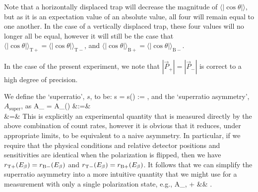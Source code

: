 Note that a horizontally displaced trap will decrease the magnitude of $\langle | \cos\theta | \rangle $, but as it is an expectation value of an absolute value, all four will remain equal to one another.  In the case of a vertically displaced trap, these four values will no longer all be equal, however it will still be the case that $\langle | \cos\theta | \rangle_{\mathrm T +} = \langle | \cos\theta | \rangle_{\mathrm T -}$, and $\langle | \cos\theta | \rangle_{\mathrm B+} = \langle | \cos\theta | \rangle_{\mathrm B -}$.  

In the case of the present experiment, we note that $|\vec{P}_+| = |\vec{P}_-|$ is correct to a high degree of precision.

We define the `superratio', $s$, to be:
\bea
s \;\;=\;\; s(\Ebeta) \;\;:=\;\; , 
\eea
and the `superratio asymmetry', $A_{\mathrm{super}}$, as
\bea
A_{} \;\;=\;\; A_{}(\Ebeta) &:=&  
\\
&=& 
\eea
%
This is explicitly an experimental quantity that is measured directly by the above combination of count rates, however it is obvious that it reduces, under appropriate limits, to be equivalent to a naive asymmetry.  In particular, if we require that the physical conditions and relative detector positions and sensitivities are identical when the polarization is flipped, then we have $r_{\mathrm T+}(E_{\beta}) = r_{\mathrm B-}(E_{\beta})$ and $r_{\mathrm T-}(E_{\beta}) = r_{\mathrm B+}(E_{\beta})$.
It follows that we can simplify the superratio asymmetry into a more intuitive quantity that we might use for a measurement with only a single polarization state, e.g.,  
\bea
A_{, +} &\rightarrow& . 
\label{eq:singlepol_asymmetry}
\eea

